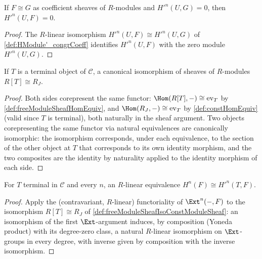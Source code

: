 \begin{lemma}
  \label{lem:HModule'_subsingleton_of_congrCoeff}
  \leanok
  If \(F \cong G\) as coefficient sheaves of \(R\)-modules and \(H'^n(U, G) = 0\), then
  \(H'^n(U, F) = 0\).
\end{lemma}
\begin{proof}
  \leanok
  The \(R\)-linear isomorphism \(H'^n(U, F) \cong H'^n(U, G)\) of \ref{def:HModule'_congrCoeff}
  identifies \(H'^n(U, F)\) with the zero module \(H'^n(U, G)\).
\end{proof}

\begin{definition}
  \label{def:freeModuleSheafIsoConstModuleSheaf}
  \leanok
  If \(T\) is a terminal object of \(\mathcal C\), a canonical isomorphism of sheaves of
  \(R\)-modules \(R[T] \cong R_J\).
\end{definition}
\begin{proof}
  \leanok
  Both sides corepresent the same functor: \(\Hom(R[T], -) \cong \mathrm{ev}_T\) by
  \ref{def:freeModuleSheafHomEquiv}, and \(\Hom(R_J, -) \cong \mathrm{ev}_T\) by
  \ref{def:constHomEquiv} (valid since \(T\) is terminal), both naturally in the sheaf
  argument. Two objects corepresenting the same functor via natural equivalences are
  canonically isomorphic: the isomorphism corresponds, under each equivalence, to the section
  of the other object at \(T\) that corresponds to its own identity morphism, and the two
  composites are the identity by naturality applied to the identity morphism of each side.
\end{proof}

\begin{definition}
  \label{def:HModule_linearEquivHModule'}
  \leanok
  For \(T\) terminal in \(\mathcal C\) and every \(n\), an \(R\)-linear equivalence
  \(H^n(F) \cong H'^n(T, F)\).
\end{definition}
\begin{proof}
  \leanok
  Apply the (contravariant, \(R\)-linear) functoriality of \(\Ext^n(-, F)\) to the
  isomorphism \(R[T] \cong R_J\) of \ref{def:freeModuleSheafIsoConstModuleSheaf}: an
  isomorphism of the first \(\Ext\)-argument induces, by composition (Yoneda product) with
  its degree-zero class, a natural \(R\)-linear isomorphism on \(\Ext\)-groups in every
  degree, with inverse given by composition with the inverse isomorphism.
\end{proof}

